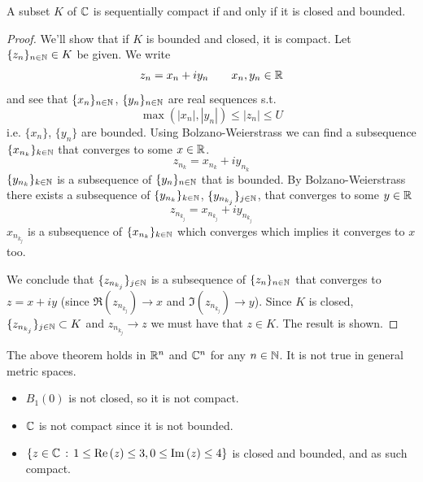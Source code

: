 \documentclass[10pt, a4paper]{article}
\begin{document}
\begin{theorem}    
    A subset $K$ of $\mathbb{C}$ is sequentially compact if and only if it is closed and bounded.

    \begin{proof}
        We'll show that if $K$ is bounded and closed,
        it is compact.
        Let $\{z_n\}_{n \in \mathbb{N}} \in K$ be given.
        We write
        \[
        z_n = x_n + iy_n\qquad x_n, y_n \in \mathbb{R}
        \]
        and see that $\{x_n\}_{n \in \mathbb{N}}$,
        $\{y_n\}_{n \in \mathbb{N}}$ are real sequences s.t.
        \[
        \max(|x_n|, |y_n|) \leq |z_n| \leq U
        \]
        i.e. $\{x_n\}$,
        $\{y_n\}$ are bounded.
        Using Bolzano-Weierstrass we can find a subsequence $\{x_{n_k}\}_{k \in \mathbb{N}}$ that converges to some $x \in \mathbb{R}$.
        \[
        z_{n_k} = x_{n_k} + iy_{n_k}
        \]
        $\{y_{n_k}\}_{k \in \mathbb{N}}$ is a subsequence of $\{y_n\}_{n \in \mathbb{N}}$ that is bounded.
        By Bolzano-Weierstrass there exists a subsequence of $\{y_{n_k}\}_{k \in \mathbb{N}}$,
        $\{y_{n_{k_j}}\}_{j \in \mathbb{N}}$,
        that converges to some $y \in \mathbb{R}$
        \[
        z_{n_{k_j}} = x_{n_{k_j}} + iy_{n_{k_j}}
        \]
        $x_{n_{k_j}}$ is a subsequence of $\{x_{n_k}\}_{k \in \mathbb{N}}$ which converges which implies it converges to $x$ too.

        We conclude that $\{z_{n_{k_j}}\}_{j \in \mathbb{N}}$ is a subsequence of $\{z_n\}_{n \in \mathbb{N}}$ that converges to $z = x + iy$
        (since $\Re(z_{n_{k_j}}) \to x$ and $\Im(z_{n_{k_j}}) \to y$).
        Since $K$ is closed,
        $\{z_{n_{k_j}}\}_{j \in \mathbb{N}} \subset K$ and $z_{n_{k_j}} \to z$ we must have that $z \in K$.
        The result is shown.
    \end{proof}
\end{theorem}
The above theorem holds in $\mathbb{R} ^ n$ and $\mathbb{C} ^ n$ for any $n \in \mathbb{N}$.
It is not true in general metric spaces.

\begin{example}\phantom{}
    \begin{itemize}
        \item $B_1(0)$ is not closed,
        so it is not compact.

        \item $\mathbb{C}$ is not compact since it is not bounded.

        \item $\{z \in \mathbb{C}\,:\, 1 \leq \mathrm{Re}\,(z) \leq 3, 0 \leq \mathrm{Im}\,(z) \leq 4\}$ is closed and bounded,
        and as such compact.
    \end{itemize}
\end{example}
\end{document}

